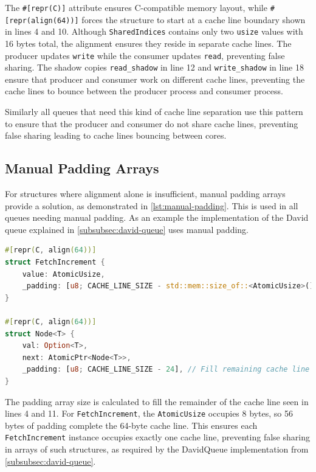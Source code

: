 The \texttt{\#[repr(C)]} attribute ensures C-compatible memory layout, while \newline \texttt{\#[repr(align(64))]} forces the structure to start at a cache line boundary shown in lines 4 and 10. Although \texttt{SharedIndices} contains only two \texttt{usize} values with 16 bytes total, the alignment ensures they reside in separate cache lines. The producer updates \texttt{write} while the consumer updates \texttt{read}, preventing false sharing. The shadow copies \texttt{read\_shadow} in line 12 and \texttt{write\_shadow} in line 18 ensure that producer and consumer work on different cache lines, preventing the cache lines to bounce between the producer process and consumer process.

Similarly all queues that need this kind of cache line separation use this pattern to ensure that the producer and consumer do not share cache lines, preventing false sharing leading to cache lines bouncing between cores.

\subsection{Manual Padding Arrays}

For structures where alignment alone is insufficient, manual padding arrays provide a solution, as demonstrated in \cref{lst:manual-padding}. This is used in all queues needing manual padding. As an example the implementation of the David queue explained in \cref{subsubsec:david-queue} uses manual padding.

\begin{lstlisting}[language=Rust, style=boxed, caption={Manual padding for exact cache line control}, label={lst:manual-padding}]
#[repr(C, align(64))]
struct FetchIncrement {
    value: AtomicUsize,
    _padding: [u8; CACHE_LINE_SIZE - std::mem::size_of::<AtomicUsize>()],
}

#[repr(C, align(64))]
struct Node<T> {
    val: Option<T>,
    next: AtomicPtr<Node<T>>,
    _padding: [u8; CACHE_LINE_SIZE - 24], // Fill remaining cache line
}
\end{lstlisting}

The padding array size is calculated to fill the remainder of the cache line seen in lines 4 and 11. For \texttt{FetchIncrement}, the \texttt{AtomicUsize} occupies 8 bytes, so 56 bytes of padding complete the 64-byte cache line. This ensures each \texttt{FetchIncrement} instance occupies exactly one cache line, preventing false sharing in arrays of such structures, as required by the DavidQueue implementation from \cref{subsubsec:david-queue}.


